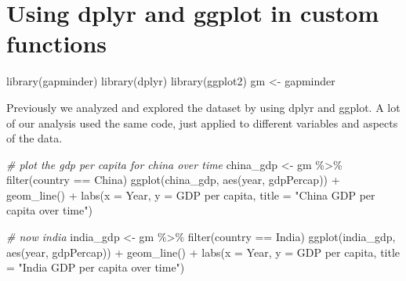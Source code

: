 \documentclass[
]{book}
\newenvironment{Shaded}{\begin{snugshade}}{\end{snugshade}}
\newcommand{\AttributeTok}[1]{\textcolor[rgb]{0.77,0.63,0.00}{#1}}
\newcommand{\CommentTok}[1]{\textcolor[rgb]{0.56,0.35,0.01}{\textit{#1}}}
\newcommand{\FunctionTok}[1]{\textcolor[rgb]{0.00,0.00,0.00}{#1}}
\newcommand{\NormalTok}[1]{#1}
\newcommand{\OtherTok}[1]{\textcolor[rgb]{0.56,0.35,0.01}{#1}}
\newcommand{\SpecialCharTok}[1]{\textcolor[rgb]{0.00,0.00,0.00}{#1}}
\newcommand{\StringTok}[1]{\textcolor[rgb]{0.31,0.60,0.02}{#1}}
\begin{document}
\hypertarget{using-dplyr-and-ggplot-in-custom-functions}{%
\section{Using dplyr and ggplot in custom functions}\label{using-dplyr-and-ggplot-in-custom-functions}}

\begin{Shaded}
\begin{Highlighting}[]
\FunctionTok{library}\NormalTok{(gapminder)}
\FunctionTok{library}\NormalTok{(dplyr)}
\FunctionTok{library}\NormalTok{(ggplot2)}
\NormalTok{gm }\OtherTok{\textless{}{-}}\NormalTok{ gapminder}
\end{Highlighting}
\end{Shaded}

Previously we analyzed and explored the dataset by using dplyr and ggplot. A lot of our analysis used the same code, just applied to different variables and aspects of the data.

\begin{Shaded}
\begin{Highlighting}[]
\CommentTok{\# plot the gdp per capita for china over time}
\NormalTok{china\_gdp }\OtherTok{\textless{}{-}}\NormalTok{ gm }\SpecialCharTok{\%\textgreater{}\%} \FunctionTok{filter}\NormalTok{(country }\SpecialCharTok{==} \StringTok{\textquotesingle{}China\textquotesingle{}}\NormalTok{)}
\FunctionTok{ggplot}\NormalTok{(china\_gdp, }\FunctionTok{aes}\NormalTok{(year, gdpPercap)) }\SpecialCharTok{+} 
  \FunctionTok{geom\_line}\NormalTok{() }\SpecialCharTok{+}
  \FunctionTok{labs}\NormalTok{(}\AttributeTok{x =} \StringTok{\textquotesingle{}Year\textquotesingle{}}\NormalTok{, }\AttributeTok{y =} \StringTok{\textquotesingle{}GDP per capita\textquotesingle{}}\NormalTok{, }\AttributeTok{title =} \StringTok{"China GDP per capita over time"}\NormalTok{)}

\CommentTok{\# now india }
\NormalTok{india\_gdp }\OtherTok{\textless{}{-}}\NormalTok{ gm }\SpecialCharTok{\%\textgreater{}\%} \FunctionTok{filter}\NormalTok{(country }\SpecialCharTok{==} \StringTok{\textquotesingle{}India\textquotesingle{}}\NormalTok{) }
\FunctionTok{ggplot}\NormalTok{(india\_gdp, }\FunctionTok{aes}\NormalTok{(year, gdpPercap)) }\SpecialCharTok{+} 
  \FunctionTok{geom\_line}\NormalTok{() }\SpecialCharTok{+}
  \FunctionTok{labs}\NormalTok{(}\AttributeTok{x =} \StringTok{\textquotesingle{}Year\textquotesingle{}}\NormalTok{, }\AttributeTok{y =} \StringTok{\textquotesingle{}GDP per capita\textquotesingle{}}\NormalTok{, }\AttributeTok{title =} \StringTok{"India GDP per capita over time"}\NormalTok{)}
\end{Highlighting}
\end{Shaded}
\end{document}
